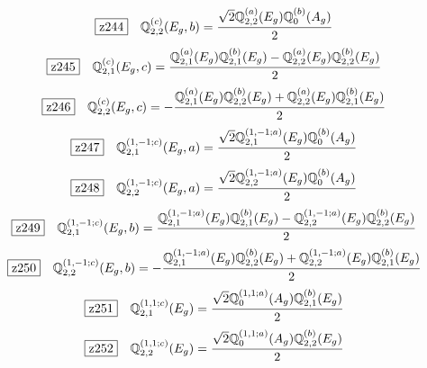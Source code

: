 \documentclass[fleqn,10pt,landscape]{jsarticle}
\begin{document}
\begin{dmath*}
\hspace*{3mm}\fbox{z244}\quad \mathbb{Q}_{2,2}^{(c)}(E_{g},b)=\frac{\sqrt{2} \mathbb{Q}_{2,2}^{(a)}(E_{g}) \mathbb{Q}_{0}^{(b)}(A_{g})}{2}
\end{dmath*}
\begin{dmath*}
\hspace*{3mm}\fbox{z245}\quad \mathbb{Q}_{2,1}^{(c)}(E_{g},c)=\frac{\mathbb{Q}_{2,1}^{(a)}(E_{g}) \mathbb{Q}_{2,1}^{(b)}(E_{g}) - \mathbb{Q}_{2,2}^{(a)}(E_{g}) \mathbb{Q}_{2,2}^{(b)}(E_{g})}{2}
\end{dmath*}
\begin{dmath*}
\hspace*{3mm}\fbox{z246}\quad \mathbb{Q}_{2,2}^{(c)}(E_{g},c)=- \frac{\mathbb{Q}_{2,1}^{(a)}(E_{g}) \mathbb{Q}_{2,2}^{(b)}(E_{g}) + \mathbb{Q}_{2,2}^{(a)}(E_{g}) \mathbb{Q}_{2,1}^{(b)}(E_{g})}{2}
\end{dmath*}
\begin{dmath*}
\hspace*{3mm}\fbox{z247}\quad \mathbb{Q}_{2,1}^{(1,-1;c)}(E_{g},a)=\frac{\sqrt{2} \mathbb{Q}_{2,1}^{(1,-1;a)}(E_{g}) \mathbb{Q}_{0}^{(b)}(A_{g})}{2}
\end{dmath*}
\begin{dmath*}
\hspace*{3mm}\fbox{z248}\quad \mathbb{Q}_{2,2}^{(1,-1;c)}(E_{g},a)=\frac{\sqrt{2} \mathbb{Q}_{2,2}^{(1,-1;a)}(E_{g}) \mathbb{Q}_{0}^{(b)}(A_{g})}{2}
\end{dmath*}
\begin{dmath*}
\hspace*{3mm}\fbox{z249}\quad \mathbb{Q}_{2,1}^{(1,-1;c)}(E_{g},b)=\frac{\mathbb{Q}_{2,1}^{(1,-1;a)}(E_{g}) \mathbb{Q}_{2,1}^{(b)}(E_{g}) - \mathbb{Q}_{2,2}^{(1,-1;a)}(E_{g}) \mathbb{Q}_{2,2}^{(b)}(E_{g})}{2}
\end{dmath*}
\begin{dmath*}
\hspace*{3mm}\fbox{z250}\quad \mathbb{Q}_{2,2}^{(1,-1;c)}(E_{g},b)=- \frac{\mathbb{Q}_{2,1}^{(1,-1;a)}(E_{g}) \mathbb{Q}_{2,2}^{(b)}(E_{g}) + \mathbb{Q}_{2,2}^{(1,-1;a)}(E_{g}) \mathbb{Q}_{2,1}^{(b)}(E_{g})}{2}
\end{dmath*}
\begin{dmath*}
\hspace*{3mm}\fbox{z251}\quad \mathbb{Q}_{2,1}^{(1,1;c)}(E_{g})=\frac{\sqrt{2} \mathbb{Q}_{0}^{(1,1;a)}(A_{g}) \mathbb{Q}_{2,1}^{(b)}(E_{g})}{2}
\end{dmath*}
\begin{dmath*}
\hspace*{3mm}\fbox{z252}\quad \mathbb{Q}_{2,2}^{(1,1;c)}(E_{g})=\frac{\sqrt{2} \mathbb{Q}_{0}^{(1,1;a)}(A_{g}) \mathbb{Q}_{2,2}^{(b)}(E_{g})}{2}
\end{dmath*}
\end{document}
